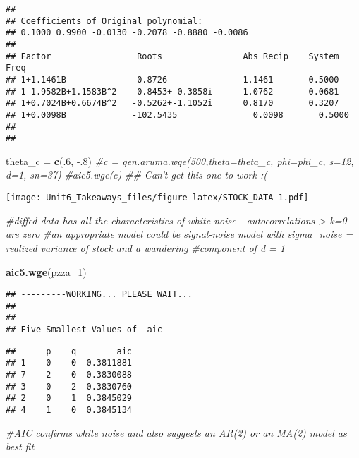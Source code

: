 \documentclass[]{article}
\newenvironment{Shaded}{\begin{snugshade}}{\end{snugshade}}
\newcommand{\CommentTok}[1]{\textcolor[rgb]{0.56,0.35,0.01}{\textit{#1}}}
\newcommand{\DataTypeTok}[1]{\textcolor[rgb]{0.13,0.29,0.53}{#1}}
\newcommand{\DecValTok}[1]{\textcolor[rgb]{0.00,0.00,0.81}{#1}}
\newcommand{\FloatTok}[1]{\textcolor[rgb]{0.00,0.00,0.81}{#1}}
\newcommand{\KeywordTok}[1]{\textcolor[rgb]{0.13,0.29,0.53}{\textbf{#1}}}
\newcommand{\NormalTok}[1]{#1}
\newcommand{\OperatorTok}[1]{\textcolor[rgb]{0.81,0.36,0.00}{\textbf{#1}}}
\newcommand{\OtherTok}[1]{\textcolor[rgb]{0.56,0.35,0.01}{#1}}
\newcommand{\StringTok}[1]{\textcolor[rgb]{0.31,0.60,0.02}{#1}}
\begin{document}
\begin{verbatim}
## 
## Coefficients of Original polynomial:  
## 0.1000 0.9900 -0.0130 -0.2078 -0.8880 -0.0086 
## 
## Factor                 Roots                Abs Recip    System Freq 
## 1+1.1461B             -0.8726               1.1461       0.5000
## 1-1.9582B+1.1583B^2    0.8453+-0.3858i      1.0762       0.0681
## 1+0.7024B+0.6674B^2   -0.5262+-1.1052i      0.8170       0.3207
## 1+0.0098B             -102.5435               0.0098       0.5000
##   
## 
\end{verbatim}

\begin{Shaded}
\begin{Highlighting}[]
\NormalTok{theta_c =}\StringTok{ }\KeywordTok{c}\NormalTok{(.}\DecValTok{6}\NormalTok{, }\FloatTok{-.8}\NormalTok{)}
\CommentTok{#c = gen.aruma.wge(500,theta=theta_c, phi=phi_c, s=12, d=1,  sn=37)}
\CommentTok{#aic5.wge(c)}
\CommentTok{## Can't get this one to work :(}
\end{Highlighting}
\end{Shaded}

\begin{Shaded}
\end{Shaded}

\texttt{[image: Unit6\_Takeaways\_files/figure-latex/STOCK\_DATA-1.pdf]}

\begin{Shaded}
\begin{Highlighting}[]
\CommentTok{#diffed data has all the characteristics of white noise - autocorrelations > k=0 are zero}
\CommentTok{#an appropriate model could be signal-noise model with sigma_noise = realized variance of stock and a wandering }
\CommentTok{#component of d = 1}

\KeywordTok{aic5.wge}\NormalTok{(pzza_}\DecValTok{1}\NormalTok{)}
\end{Highlighting}
\end{Shaded}

\begin{verbatim}
## ---------WORKING... PLEASE WAIT... 
## 
## 
## Five Smallest Values of  aic
\end{verbatim}

\begin{verbatim}
##      p    q        aic
## 1    0    0  0.3811881
## 7    2    0  0.3830088
## 3    0    2  0.3830760
## 2    0    1  0.3845029
## 4    1    0  0.3845134
\end{verbatim}

\begin{Shaded}
\begin{Highlighting}[]
\CommentTok{#AIC confirms white noise and also suggests an AR(2) or an MA(2) model as best fit}
\end{Highlighting}
\end{Shaded}
\end{document}
